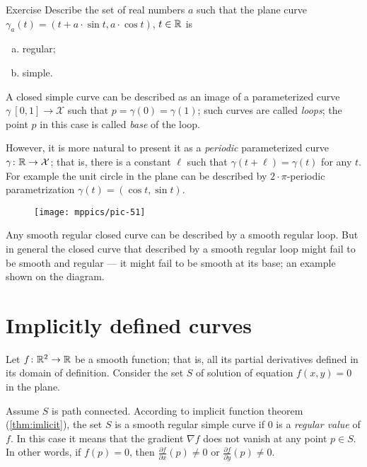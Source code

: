 \begin{thm}{Exercise}\label{ex:cycloid}
Describe the set of real numbers $a$
such that the plane curve $\gamma_a(t)= (t+a\cdot \sin t,a\cdot \cos t)$, $t\in\mathbb{R}$ is
\begin{enumerate}[(a)]
\item regular;
\item simple.
\end{enumerate}

\end{thm}

A closed simple curve can be described as an image of a parameterized curve $\gamma\: [0,1]\to \mathcal{X}$ such that $p=\gamma(0)=\gamma(1)$;
such curves are called \emph{loops}; 
the point $p$ in this case is called \emph{base} of the loop.

However, it is more natural to present it as a \emph{periodic} parameterized curve $\gamma\colon \mathbb{R}\to \mathcal{X}$; that is, there is a constant $\ell$ such that $\gamma(t+\ell)=\gamma(t)$ for any $t$.
For example the unit circle in the plane can be described by $2{\cdot}\pi$-periodic parametrization $\gamma(t)=(\cos t,\sin t)$.

\begin{wrapfigure}{r}{17 mm}
\vskip-5mm
\centering
\texttt{[image: mppics/pic-51]}
\end{wrapfigure}

Any smooth regular closed curve can be described by a smooth regular loop.
But in general the closed curve that described by a smooth regular loop might fail to be smooth and regular --- it might fail to be smooth at its base; an example shown on the diagram.


\section*{Implicitly defined curves}

Let $f\colon\mathbb{R}^2\to \mathbb{R}$ be a smooth function; 
that is, all its partial derivatives defined in its domain of definition.
Consider the set $S$ of solution of equation $f(x,y)=0$ in the plane.

Assume $S$ is path connected.
According to implicit function theorem (\ref{thm:imlicit}), the set $S$ is a smooth regular simple curve if $0$ is a \emph{regular value} of $f$.
In this case it means that the gradient $\nabla f$ does not vanish at any point $p\in S$.
In other words, if $f(p)=0$, then  $\tfrac{\partial f}{\partial x}(p)\ne 0$ or $\tfrac{\partial f}{\partial y}(p)\ne 0$.


